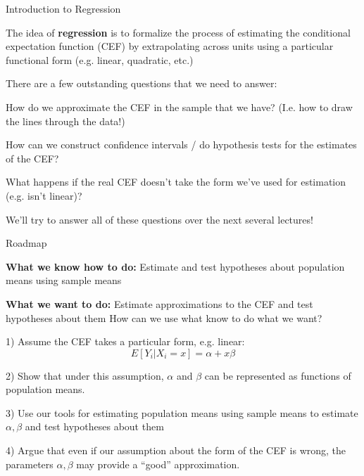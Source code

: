 \documentclass[11pt,english,handout]{beamer}
\newenvironment{wideitemize}{\itemize\addtolength{\itemsep}{10pt}}{\enditemize}
\begin{document}
\begin{frame}{Introduction to Regression}
\begin{wideitemize}

\item
The idea of \textbf{regression} is to formalize the process of estimating the conditional expectation function (CEF) by extrapolating across units using a particular functional form (e.g. linear, quadratic, etc.)

\pause
\item
There are a few outstanding questions that we need to answer:

\pause
\item
How do we approximate the CEF in the sample that we have? (I.e. how to draw the lines through the data!)

\pause
\item
How can we construct confidence intervals / do hypothesis tests for the estimates of the CEF? 

\pause
\item
What happens if the real CEF doesn't take the form we've used for estimation (e.g. isn't linear)?

\pause
\item
We'll try to answer all of these questions over the next several lectures!

\end{wideitemize}	
\end{frame}	


\begin{frame}{Roadmap}
\vspace{0.2cm}
\begin{wideitemize}
\item \textbf{What we know how to do:} Estimate and test hypotheses about population means using sample means
\item \textbf{What we want to do:} Estimate approximations to the CEF and test hypotheses about them 
\end{wideitemize}
\pause
\bigskip
How can we use what know to do what we want? 
\pause
\begin{wideitemize}
	\item 1) Assume the CEF takes a particular form, e.g. linear:
	$$E[Y_i | X_i = x] = \alpha + x \beta$$
	
	\pause
	\item 2) Show that under this assumption, $\alpha$ and $\beta$ can be represented as functions of population means.
	
	\pause
	\item
	3) Use our tools for estimating population means using sample means to estimate $\alpha,\beta$ and test hypotheses about them
	
	\pause
	\item
	4) Argue that even if our assumption about the form of the CEF is wrong, the parameters $\alpha,\beta$ may provide a ``good'' approximation.
\end{wideitemize}

\end{frame}
\end{document}
